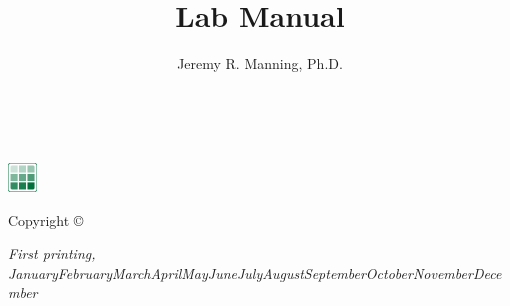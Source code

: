 \documentclass{tufte-book} %
\title{Lab Manual} %
\author{Jeremy R. Manning, Ph.D.} %
\newcommand{\monthyear}{\ifcase\month\or January\or February\or March\or April\or May\or June\or July\or August\or September\or October\or November\or December\fi\space\number\year} %
\newcommand{\openepigraph}[2]{ %
\begin{fullwidth}
\sffamily\large
\begin{doublespace}
\noindent\allcaps{#1}\\ %
\noindent\allcaps{#2} %
\end{doublespace}
\end{fullwidth}
}
\begin{document}
\frontmatter


\thispagestyle{empty}


\maketitle %

\newpage
\begin{fullwidth}
~\vfill
\thispagestyle{empty}
\setlength{\parindent}{0pt}
\setlength{\parskip}{\baselineskip}

\includegraphics[width=0.3in,left]{./lab_logo/CDL_Avatar_Cropped.png}\\\vspace{0.2in}

Copyright \copyright\ \the\year\ \thanklessauthor

\par{}

\par{}


\par\textit{First printing, \monthyear}
\end{fullwidth}


\setcounter{tocdepth}{1}
\tableofcontents %

\end{document}
